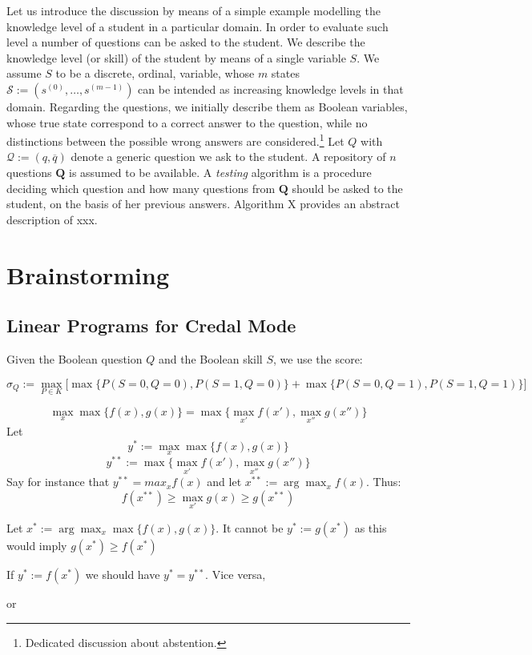 \documentclass[runningheads]{llncs}
\begin{document}
Let us introduce the discussion by means of a simple example modelling the knowledge level of a student in a particular domain. In order to evaluate such level a number of questions can be asked to the student. We describe the knowledge level (or skill) of the student by means of a single variable $S$. We assume $S$ to be a discrete, ordinal, variable, whose $m$ states $\mathcal{S}:=(s^{(0)},\ldots,s^{(m-1)})$ can be intended as increasing knowledge levels in that domain. Regarding the questions, we initially describe them as Boolean variables, whose true state correspond to a correct answer to the question, while no distinctions between the possible wrong answers are considered.\footnote{Dedicated discussion about abstention.} Let $Q$ with $\mathcal{Q}:=(q,\overline{q})$ denote a generic question we ask to the student. A repository of $n$ questions $\bm{Q}$ is assumed to be available. A \emph{testing} algorithm is a procedure deciding which question and how many questions from $\bm{Q}$ should be asked to the student, on the basis of her previous answers. Algorithm X provides an abstract description of xxx.

	\section{Brainstorming}
	
	\subsection{Linear Programs for Credal Mode}
	
	Given the Boolean question $Q$ and the Boolean skill $S$, we use the score:
	
	\begin{equation}
		\sigma_Q := \max_{P\in K} \bigl[ 
		\max \{ P(S=0,Q=0) , P(S=1,Q=0) \}  + \max \{ P(S=0,Q=1),P(S=1,Q=1)\}
		\bigr]
	\end{equation}
	
	\begin{theorem}
		\begin{equation}
			\max_{x}  \max \{ f(x) , g(x) \}  
			=
			\max \{ \max_{x'} f(x') , \max_{x''} g(x'') \} 
		\end{equation}
		Let 
		$$y^{*}:=\max_x \max\{f(x),g(x)\}$$
		$$y^{**}:= \max \{ \max_{x'} f(x') , \max_{x''} g(x'') \}$$
		Say for instance that $y^{**}=max_x f(x)$ and let $x^{**}:=\arg\max_x f(x)$. Thus:
		$$f(x^{**})\geq \max_{x'} g(x) \geq g(x^{**})$$ 
		
		Let $x^{*}:= \arg\max_x \max\{f(x),g(x)\}$. 
		It cannot be $y^{*}:=g(x^{*})$ as this would imply $g(x^{*}) \geq f(x^{*})$ 
		
		
		
		
		If $y^{*}:=f(x^{*})$ we should have $y^{*}=y^{**}$.
		Vice versa, 
		
		or
	\end{theorem}
	
\end{document}
